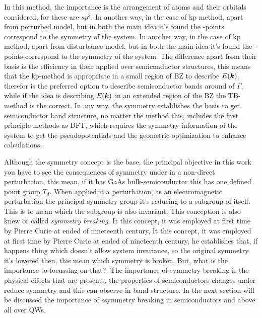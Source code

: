 In this method, the importance is the arrangement of atoms and their orbitals considered, for  these are $sp^{3}$. 
In another way, in the case of \gls{kp} method, apart from perturbed model, but in both the main idea it's found the \ks-points correspond to the symmetry of the system. In another way, in the case of \gls{kp} method, apart from disturbance model, but in both the main idea it's found the \ks-points correspond to the symmetry of the system. The difference apart from their basis is the efficiency in their applied over semiconductor structures, this means that the \gls{kp}-method is appropriate in a small region of \gls{BZ} to describe $E{(\boldsymbol{k} )}$, therefor is the preferred option to describe semiconductor bands around of $\Gamma$, while if the idea is describing $E{(\boldsymbol{k})}$ in an extended region of the \gls{BZ} the \gls{TB}-method is the correct\cite{dresselhaus2007group,bir1974symmetry}. In any way, the symmetry establishes the basis to get semiconductor band structure, no matter the method this, includes the first principle methods as DFT, which requires the symmetry information of the system to get the pseudopotentials and the geometric optimization to enhance calculations.

Although the symmetry concept is the base, the principal objective in this work you have to see the consequences of symmetry under in a non-direct perturbation, this mean, if it has GaAs bulk-semiconductor this has one defined point group $T_{d}$. When applied it a perturbation, as an electromagnetic perturbation the principal symmetry group it's reducing to a subgroup of itself. This is to mean which the subgroup is also invariant. This conception is also knew or called \emph{symmetry breaking}. It this concept, it was employed at first time by Pierre Curie at ended of nineteenth century\cite{sep-symmetry-breaking}, It this concept, it was employed at first time by Pierre Curie at ended of nineteenth century, he establishes that, if happens thing which doesn't allow system invariance, so the original symmetry it's lowered then,  this mean which symmetry is broken. 
But, what is  the importance to focussing on that?. The importance of symmetry breaking is the physical effects that are presents, the properties of semiconductors changes under reduce symmetry and this can observe in band structure.  In the next section will be discussed the importance of ssymmetry breaking in semiconductors and above all over QWs. 



